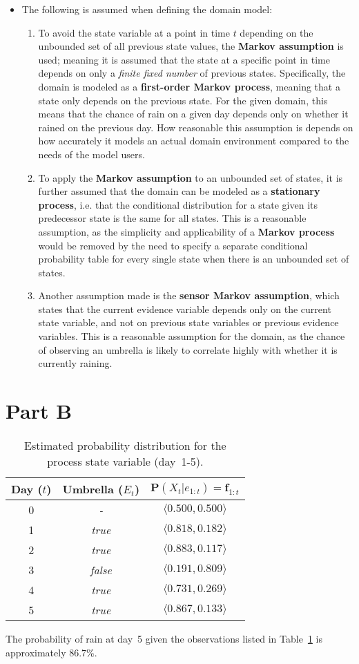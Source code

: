 \begin{itemize}
\item The following is assumed when defining the domain model:
\begin{enumerate}
\item To avoid the state variable at a point in time $t$ depending on the unbounded set of all previous state values, the \textbf{Markov assumption} is used; meaning it is assumed that the state at a specific point in time depends on only a \textit{finite fixed number} of previous states. Specifically, the domain is modeled as a \textbf{first-order Markov process}, meaning that a state only depends on the previous state. For the given domain, this means that the chance of rain on a given day depends only on whether it rained on the previous day. How reasonable this assumption is depends on how accurately it models an actual domain environment compared to the needs of the model users.
\item To apply the \textbf{Markov assumption} to an unbounded set of states, it is further assumed that the domain can be modeled as a \textbf{stationary process}, i.e. that the conditional distribution for a state given its predecessor state is the same for all states. This is a reasonable assumption, as the simplicity and applicability of a \textbf{Markov process} would be removed by the need to specify a separate conditional probability table for every single state when there is an unbounded set of states.
\item Another assumption made is the \textbf{sensor Markov assumption}, which states that the current evidence variable depends only on the current state variable, and not on previous state variables or previous evidence variables. This is a reasonable assumption for the domain, as the chance of observing an umbrella is likely to correlate highly with whether it is currently raining.
\end{enumerate}
\end{itemize}

\section*{Part B}

\begin{table}[H]
\centering
\begin{tabular}{ccc}
\toprule
Day ($t$) & Umbrella ($E_t$) & $\mathbf{P}(X_t \vert e_{1:t}) = \mathbf{f}_{1:t}$ \\
\midrule
0 & \textit{-} & $\langle 0.500, 0.500 \rangle$ \\
1 & \textit{true} & $\langle 0.818, 0.182 \rangle$ \\
2 & \textit{true} & $\langle 0.883, 0.117 \rangle$ \\
3 & \textit{false} & $\langle 0.191, 0.809 \rangle$ \\
4 & \textit{true} & $\langle 0.731, 0.269 \rangle$ \\
5 & \textit{true} & $\langle 0.867, 0.133 \rangle$ \\
\bottomrule
\end{tabular}
\caption{Estimated probability distribution for the process state variable (day~1-5).}
\label{table:first}
\end{table}

The probability of rain at day~5 given the observations listed in Table~\ref{table:first} is approximately 86.7\%.



